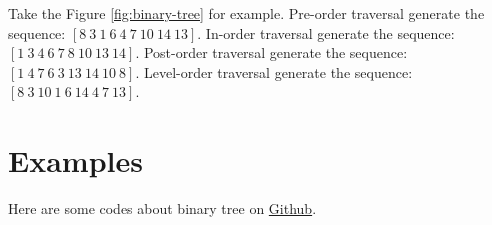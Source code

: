 Take the Figure \ref{fig:binary-tree} for example.
Pre-order traversal generate the sequence: \([8\ 3\ 1\ 6\ 4\ 7\ 10\ 14\ 13]\).
In-order traversal generate the sequence: \([1\ 3\ 4\ 6\ 7\ 8\ 10\ 13\ 14]\).
Post-order traversal generate the sequence: \([1\ 4\ 7\ 6\ 3\ 13\ 14\ 10\ 8]\).
Level-order traversal generate the sequence: \([8\ 3\ 10\ 1\ 6\ 14\ 4\ 7\ 13]\).


\section{Examples}
\label{sec:examples-1}

Here are some codes about binary tree on \href{https://github.com/mingmingli916/algorithms/tree/main/binary_tree}{Github}.

